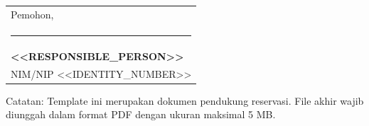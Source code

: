 \documentclass[11pt,a4paper]{article}
\begin{document}
\vspace{16pt}
\begin{tabularx}{\textwidth}{@{}X@{}}
  \centering Pemohon, \tabularnewline[26mm]
  \centering\rule{62mm}{0.4pt} \tabularnewline
  \centering\textbf{<<RESPONSIBLE_PERSON>>} \tabularnewline
  \centering NIM/NIP <<IDENTITY_NUMBER>>
\end{tabularx}

\vfill
{\footnotesize\color{TextSecondary}
Catatan: Template ini merupakan dokumen pendukung reservasi. File akhir wajib diunggah dalam format PDF dengan ukuran maksimal 5 MB.
}
\end{document}
